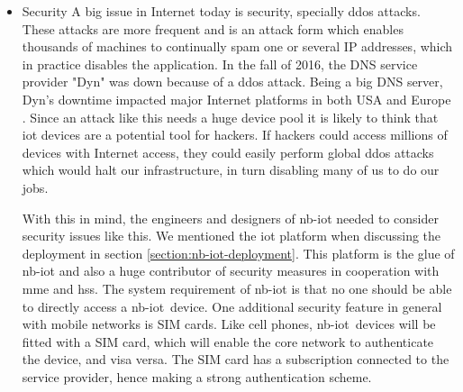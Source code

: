 \documentclass[USenglish]{ifimaster}  %
\begin{document}
\begin{itemize}
  \item Security \newline
  A big issue in Internet today is security, specially \acrshort{ddos} attacks. These attacks are more frequent and is an attack form which enables thousands of machines to continually spam one or several IP addresses, which in practice disables the application. In the fall of 2016, the DNS service provider "Dyn" was down because of a \acrshort{ddos} attack. Being a big DNS server, Dyn's downtime impacted major Internet platforms in both USA and Europe \cite{online:ddosAttack}. Since an attack like this needs a huge device pool it is likely to think that \acrshort{iot} devices are a potential tool for hackers. If hackers could access millions of devices with Internet access, they could easily perform global \acrshort{ddos} attacks which would halt our infrastructure, in turn disabling many of us to do our jobs.

  With this in mind, the engineers and designers of \acrshort{nb-iot} needed to consider security issues like this. We mentioned the \acrshort{iot} platform when discussing the deployment in section \ref{section:nb-iot-deployment}. This platform is the glue of \acrshort{nb-iot} and also a huge contributor of security measures in cooperation with \acrshort{mme} and \acrshort{hss}. The system requirement of \acrshort{nb-iot} is that no one should be able to directly access a \acrshort{nb-iot} device. One additional security feature in general with mobile networks is SIM cards. Like cell phones, \acrshort{nb-iot} devices will be fitted with a SIM card, which will enable the core network to authenticate the device, and visa versa. The SIM card has a subscription connected to the service provider, hence making a strong authentication scheme.
\end{itemize}
\end{document}
